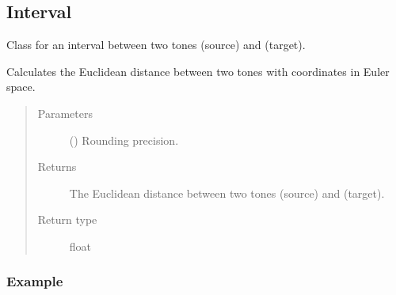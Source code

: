 \documentclass[letterpaper,10pt,english]{sphinxmanual}
\begin{document}
\subsection{Interval}
\label{\detokenize{api:interval}}

\begin{fulllineitems}
\label{\detokenize{api:main.Interval}}
Class for an interval between two tones  (source) and  (target).

\begin{fulllineitems}
\label{\detokenize{api:main.Interval.get_euclidean_distance}}
Calculates the Euclidean distance between two tones
with coordinates in Euler space.
\begin{quote}\begin{description}
\item[{Parameters}] \leavevmode
{} () \textendash{} Rounding precision.

\item[{Returns}] \leavevmode
The Euclidean distance between two tones  (source) and  (target).

\item[{Return type}] \leavevmode
float

\end{description}\end{quote}
\subsubsection*{Example}

\begin{sphinxVerbatim}[commandchars=\\\{\}]
   
   
  
\end{sphinxVerbatim}


\end{fulllineitems}
\end{fulllineitems}
\end{document}
